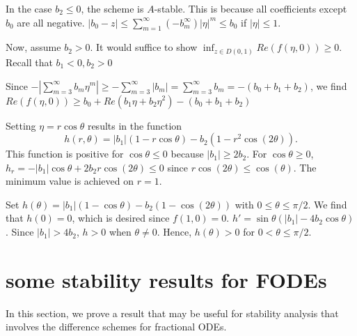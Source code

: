 \documentclass[11pt]{article}
\begin{document}
 In the case $b_2\le 0$, the scheme is $A$-stable. This is because all coefficients except $b_0$ are all negative. $|b_0-z|\le \sum_{m=1}^{\infty}(-b_m^{\infty})|\eta|^m\le b_0$
if $|\eta|\le 1$. 

Now, assume $b_2>0$. It would suffice to show $\inf_{z\in D(0,1)}Re(f(\eta, 0))\ge 0$. Recall that $b_1<0, b_2>0$

Since $-|\sum_{m=3}^{\infty}b_m\eta^m|\ge -\sum_{m=3}^{\infty}|b_m|
=\sum_{m=3}^{\infty}b_m=-(b_0+b_1+b_2)$, we find 
 $Re(f(\eta,0))\ge b_0+Re(b_1\eta+b_2\eta^2)-(b_0+b_1+b_2)$

Setting $\eta=r\cos\theta$ results in the function $$
h(r,\theta)=|b_1|(1-r\cos\theta)-b_2(1-r^2\cos(2\theta)).
$$
This function is positive for $\cos\theta\le 0$ because $|b_1|\ge 2b_2$. For $\cos\theta\ge 0$, $h_r=-|b_1|\cos\theta+2b_2r\cos(2\theta)\le 0$ since $r\cos(2\theta)\le\cos(\theta)$. The minimum value is achieved on $r=1$. 

Set $h(\theta)=|b_1|(1-\cos\theta)-b_2(1-\cos(2\theta))$ with $0\le\theta\le \pi/2$. We find that $h(0)=0$, which is desired since $f(1,0)=0$. $h'=\sin\theta (|b_1|-4b_2\cos\theta)$. Since $|b_1|>4b_2$, $h>0$ when $\theta\neq 0$.  Hence, $h(\theta)>0$ for $0<\theta\le \pi/2$.

\section{some stability results for FODEs}
In this section, we prove a result that may be useful for stability analysis
that involves the difference schemes for fractional ODEs.
\end{document}

